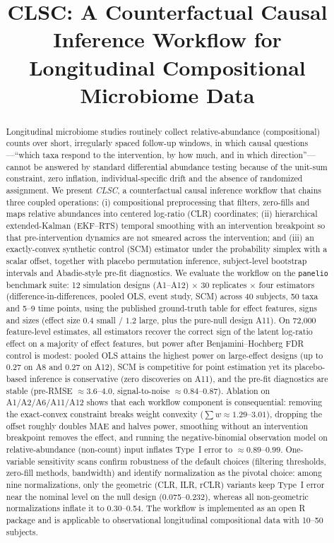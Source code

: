 \documentclass[11pt]{article}
\title{CLSC: A Counterfactual Causal Inference Workflow for Longitudinal Compositional Microbiome Data}
\author{}
\date{}
\begin{document}
\maketitle

\begin{abstract}
Longitudinal microbiome studies routinely collect relative-abundance (compositional) counts over short, irregularly spaced follow-up windows, in which causal questions---``which taxa respond to the intervention, by how much, and in which direction''---cannot be answered by standard differential abundance testing because of the unit-sum constraint, zero inflation, individual-specific drift and the absence of randomized assignment. We present \emph{CLSC}, a counterfactual causal inference workflow that chains three coupled operations: (i) compositional preprocessing that filters, zero-fills and maps relative abundances into centered log-ratio (CLR) coordinates; (ii) hierarchical extended-Kalman (EKF--RTS) temporal smoothing with an intervention breakpoint so that pre-intervention dynamics are not smeared across the intervention; and (iii) an exactly-convex synthetic control (SCM) estimator under the probability simplex with a scalar offset, together with placebo permutation inference, subject-level bootstrap intervals and Abadie-style pre-fit diagnostics. We evaluate the workflow on the \texttt{panelio} benchmark suite: 12 simulation designs (A1--A12) $\times$ 30 replicates $\times$ four estimators (difference-in-differences, pooled OLS, event study, SCM) across 40 subjects, 50 taxa and 5--9 time points, using the published ground-truth table for effect features, signs and sizes (effect size $0.4$ small / $1.2$ large, plus the pure-null design A11). On 72{,}000 feature-level estimates, all estimators recover the correct sign of the latent log-ratio effect on a majority of effect features, but power after Benjamini--Hochberg FDR control is modest: pooled OLS attains the highest power on large-effect designs (up to 0.27 on A8 and 0.27 on A12), SCM is competitive for point estimation yet its placebo-based inference is conservative (zero discoveries on A11), and the pre-fit diagnostics are stable (pre-RMSE $\approx 3.6$--$4.0$, signal-to-noise $\approx 0.84$--$0.87$). Ablation on A1/A2/A6/A11/A12 shows that each workflow component is consequential: removing the exact-convex constraint breaks weight convexity ($\sum w \approx 1.29$--$3.01$), dropping the offset roughly doubles MAE and halves power, smoothing without an intervention breakpoint removes the effect, and running the negative-binomial observation model on relative-abundance (non-count) input inflates Type~I error to $\approx 0.89$--$0.99$. One-variable sensitivity scans confirm robustness of the default choices (filtering thresholds, zero-fill methods, bandwidth) and identify normalization as the pivotal choice: among nine normalizations, only the geometric (CLR, ILR, rCLR) variants keep Type~I error near the nominal level on the null design (0.075--0.232), whereas all non-geometric normalizations inflate it to 0.30--0.54. The workflow is implemented as an open R package and is applicable to observational longitudinal compositional data with 10--50 subjects.
\end{abstract}
\end{document}

